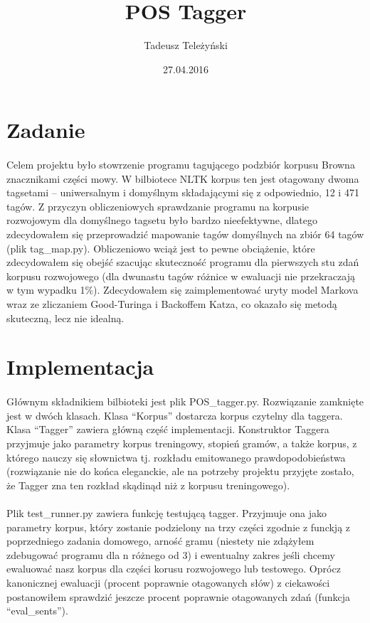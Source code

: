\documentclass[11pt, a4paper]{article}
\title{POS Tagger}
\author{Tadeusz Teleżyński}
\date{27.04.2016}
\begin{document}
\maketitle
\section{Zadanie}
\paragraph{} 
Celem projektu było stowrzenie programu tagującego podzbiór korpusu Browna znacznikami części mowy. W bilbiotece NLTK korpus ten jest otagowany dwoma tagsetami -- uniwersalnym i domyślnym składającymi się z odpowiednio, 12 i 471 tagów. Z przyczyn obliczeniowych sprawdzanie programu na korpusie rozwojowym dla domyślnego tagsetu było bardzo nieefektywne, dlatego zdecydowałem się przeprowadzić mapowanie tagów domyślnych na zbiór 64 tagów (plik tag\_map.py). Obliczeniowo wciąż jest to pewne obciążenie, które zdecydowałem się obejść szacując skuteczność programu dla pierwszych stu zdań korpusu rozwojowego (dla dwunastu tagów różnice w ewaluacji nie przekraczają w tym wypadku 1\%).
Zdecydowałem się zaimplementować uryty model Markova wraz ze zliczaniem Good-Turinga i Backoffem Katza, co okazało się metodą skuteczną, lecz nie idealną.
\section{Implementacja}
\paragraph{}
Głównym składnikiem bilbioteki jest plik POS\_tagger.py. Rozwiązanie zamknięte jest w dwóch klasach. Klasa ``Korpus'' dostarcza korpus czytelny dla taggera. Klasa ``Tagger'' zawiera główną część implementacji. Konstruktor Taggera przyjmuje jako parametry korpus treningowy, stopień gramów, a także korpus, z którego nauczy się słownictwa tj. rozkładu emitowanego prawdopodobieństwa (rozwiązanie nie do końca eleganckie, ale na potrzeby projektu przyjęte zostało, że Tagger zna ten rozkład skądinąd niż z korpusu treningowego). 
\paragraph{}
Plik test\_runner.py zawiera funkcję testującą tagger. Przyjmuje ona jako parametry korpus, który zostanie podzielony na trzy części zgodnie z funckją z poprzedniego zadania domowego, arność gramu (niestety nie zdążyłem zdebugować programu dla n różnego od 3) i ewentualny zakres jeśli chcemy ewaluować nasz korpus dla części korusu rozwojowego lub testowego. Oprócz kanonicznej ewaluacji (procent poprawnie otagowanych słów) z ciekawości postanowiłem sprawdzić jeszcze procent poprawnie otagowanych zdań (funkcja ``eval\_sents'').
\end{document}
